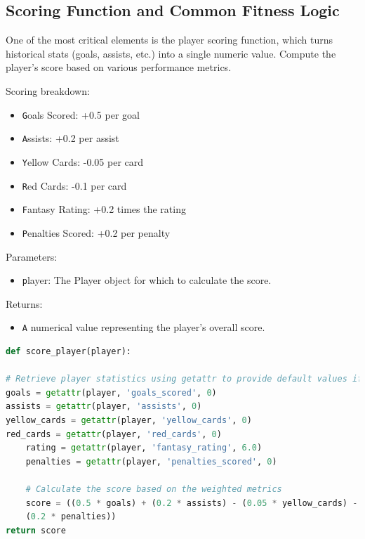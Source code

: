 \documentclass[sigconf]{acmart}
\begin{document}
	\subsection{Scoring Function and Common Fitness Logic}
	\label{sec:score-fitness}
	One of the most critical elements is the player scoring function, which turns historical stats (goals, assists, etc.) into a single numeric value. Compute the player's score based on various performance metrics.
	
Scoring breakdown:
		\begin{itemize}
\item \texttt Goals Scored: +0.5 per goal
\item \texttt Assists: +0.2 per assist
\item \texttt Yellow Cards: -0.05 per card
\item \texttt Red Cards: -0.1 per card
\item \texttt Fantasy Rating: +0.2 times the rating
\item \texttt Penalties Scored: +0.2 per penalty
\end{itemize}
	
Parameters:
		\begin{itemize}
\item \texttt player: The Player object for which to calculate the score.
\end{itemize}
	
Returns:
		\begin{itemize}
\item \texttt A numerical value representing the player's overall score.
\end{itemize}
	
\begin{lstlisting}[language=Python, caption=Example scoring function in utils.py]
def score_player(player):

# Retrieve player statistics using getattr to provide default values if not set
goals = getattr(player, 'goals_scored', 0)
assists = getattr(player, 'assists', 0)
yellow_cards = getattr(player, 'yellow_cards', 0)
red_cards = getattr(player, 'red_cards', 0)
	rating = getattr(player, 'fantasy_rating', 6.0)
	penalties = getattr(player, 'penalties_scored', 0)
	
	# Calculate the score based on the weighted metrics
	score = ((0.5 * goals) + (0.2 * assists) - (0.05 * yellow_cards) - (0.1 * red_cards) + (0.2 * rating) +
	(0.2 * penalties))
return score
	\end{lstlisting}
	
\end{document}
